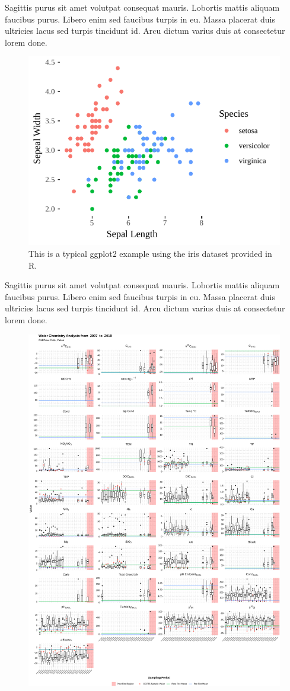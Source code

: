 \documentclass[article,30pt,extrafontsizes,showtrims]{memoir}
\begin{document}
\begin{multicols*}{3}
{Sagittis purus sit amet volutpat consequat mauris. Lobortis mattis
aliquam faucibus purus. Libero enim sed faucibus turpis in eu. Massa
placerat duis ultricies lacus sed turpis tincidunt id. Arcu dictum
varius duis at consectetur lorem done.

\begin{figure}

{\centering \includegraphics[width=0.6\linewidth]{skeleton_files/figure-latex/unnamed-chunk-3-1} 

}

\caption{This is a typical ggplot2 example using the iris dataset provided in R.}\label{fig:unnamed-chunk-3}
\end{figure}

Sagittis purus sit amet volutpat consequat mauris. Lobortis mattis
aliquam faucibus purus. Libero enim sed faucibus turpis in eu. Massa
placerat duis ultricies lacus sed turpis tincidunt id. Arcu dictum
varius duis at consectetur lorem done.

\begin{figure}

{\centering \includegraphics[width=0.8\linewidth]{Figures/figure2} 

}
\end{figure}}
\end{multicols*}
\end{document}
